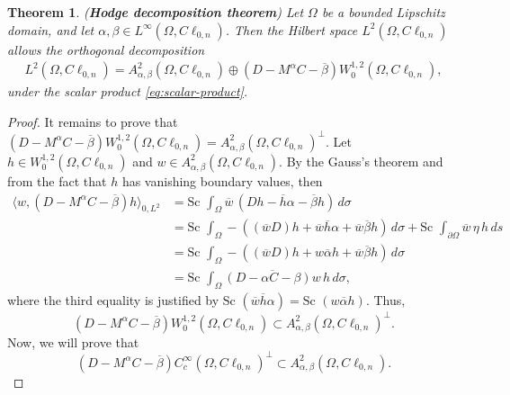 \documentclass[12pt]{article}
\newcommand{\comment}[1]{\marginpar{\hfuzz=5ex
\scriptsize$\stackrel{?}{\longleftarrow}$\\\hspace*{-3ex}
{\fbox{\parbox{20ex}{\hfuzz=15ex \raggedright\sf#1 }}} }}
\newtheorem{theorem}{Theorem}
\begin{document}
\begin{theorem}\label{th:Hodge-decomposition}(\textbf{Hodge decomposition theorem})
Let $\Omega$ be a bounded Lipschitz domain, and let $\alpha, \beta\in L^{\infty}(\Omega,C\ell_{0,n})$.
Then the Hilbert space $L^2(\Omega,C\ell_{0,n})$ allows the orthogonal decomposition
\begin{align}\label{eq:Hodge-2}  L^2(\Omega,C\ell_{0,n})=A_{\alpha,\beta}^2(\Omega,C\ell_{0,n})\oplus (D-M^{\alpha}C-\overline{\beta}) W_0^{1,2}(\Omega,C\ell_{0,n}),
\end{align} 
under the scalar product \eqref{eq:scalar-product}.
\end{theorem}
\begin{proof}
It remains to prove that $(D-M^{\alpha}C-\overline{\beta}) W_0^{1,2}(\Omega,C\ell_{0,n})=A_{\alpha,\beta}^2(\Omega,C\ell_{0,n})^{\bot}$.
Let $h\in W_0^{1,2}(\Omega,C\ell_{0,n})$ and $w\in A_{\alpha,\beta}^2(\Omega,C\ell_{0,n})$. By the Gauss's theorem and from the fact that $h$ has vanishing boundary values, then
\begin{align}\label{eq:computations-orthogonal}
  \nonumber \langle w, (D-M^{\alpha}C-\overline{\beta})h \rangle_{0,L^2}&=\text{Sc }\int_{\Omega} \overline{w} \, (Dh-\overline{h}\alpha-\overline{\beta}h)\, d\sigma\\
  \nonumber &=\text{Sc }\int_{\Omega} -((\overline{w}D)h+\overline{w}\overline{h}\alpha+\overline{w}\overline{\beta}h)\, d\sigma+\text{Sc }\int_{\partial\Omega} \overline{w} \,\eta\,  h\, ds\\
    \nonumber &=\text{Sc }\int_{\Omega} -((\overline{w}D)h+w\overline{\alpha}h+\overline{w}\overline{\beta}h)\, d\sigma\\
    &=\text{Sc }\int_{\Omega} \overline{(D-\alpha C-\beta)w} \, h\, d\sigma,
\end{align}
where the third equality is justified by $\text{Sc }(\overline{w}\overline{h}\alpha)=\text{Sc }(w\overline{\alpha}h)$. Thus, 
\begin{equation*}%
(D-M^{\alpha}C-\overline{\beta}) W_0^{1,2}(\Omega,C\ell_{0,n})\subset A_{\alpha,\beta}^2(\Omega,C\ell_{0,n})^{\bot}.
\end{equation*}
Now, we will prove that 
\begin{equation}\label{eq:contention-2}
(D-M^{\alpha}C-\overline{\beta})C_{c}^{\infty}(\Omega,C\ell_{0,n})^{\bot}\subset A_{\alpha,\beta}^2(\Omega,C\ell_{0,n}).
\end{equation}


\end{proof}
\end{document}
